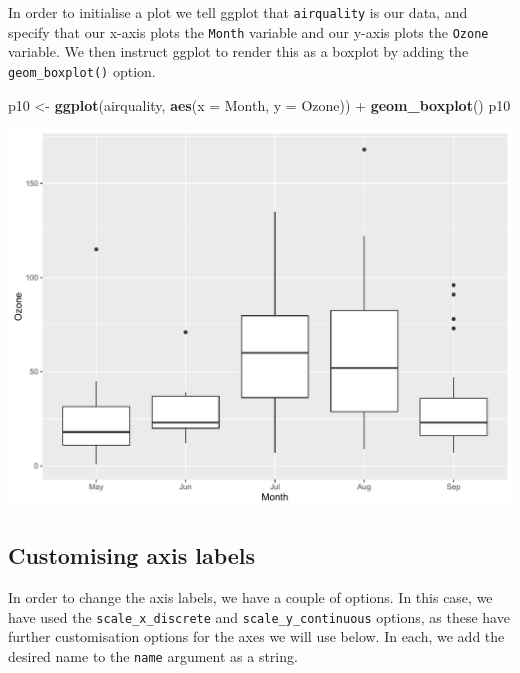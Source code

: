 \documentclass[]{article}
\newenvironment{Shaded}{\begin{snugshade}}{\end{snugshade}}
\newcommand{\KeywordTok}[1]{\textcolor[rgb]{0.13,0.29,0.53}{\textbf{{#1}}}}
\newcommand{\DataTypeTok}[1]{\textcolor[rgb]{0.13,0.29,0.53}{{#1}}}
\newcommand{\StringTok}[1]{\textcolor[rgb]{0.31,0.60,0.02}{{#1}}}
\newcommand{\NormalTok}[1]{{#1}}
\begin{document}
In order to initialise a plot we tell ggplot that \texttt{airquality} is
our data, and specify that our x-axis plots the \texttt{Month} variable
and our y-axis plots the \texttt{Ozone} variable. We then instruct
ggplot to render this as a boxplot by adding the
\texttt{geom\_boxplot()} option.

\begin{Shaded}
\begin{Highlighting}[]
\NormalTok{p10 <-}\StringTok{ }\KeywordTok{ggplot}\NormalTok{(airquality, }\KeywordTok{aes}\NormalTok{(}\DataTypeTok{x =} \NormalTok{Month, }\DataTypeTok{y =} \NormalTok{Ozone)) +}\StringTok{ }
\StringTok{        }\KeywordTok{geom_boxplot}\NormalTok{()}
\NormalTok{p10}
\end{Highlighting}
\end{Shaded}

\begin{center}\includegraphics{0_all_posts_pdf/box_1-1} \end{center}

\subsection{Customising axis labels}\label{customising-axis-labels-3}

In order to change the axis labels, we have a couple of options. In this
case, we have used the \texttt{scale\_x\_discrete} and
\texttt{scale\_y\_continuous} options, as these have further
customisation options for the axes we will use below. In each, we add
the desired name to the \texttt{name} argument as a string.
\end{document}
